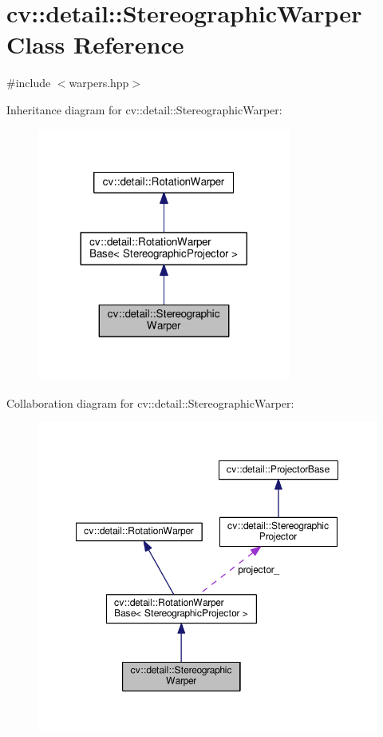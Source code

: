 \hypertarget{classcv_1_1detail_1_1StereographicWarper}{\section{cv\-:\-:detail\-:\-:Stereographic\-Warper Class Reference}
\label{classcv_1_1detail_1_1StereographicWarper}
}


{\ttfamily \#include $<$warpers.\-hpp$>$}



Inheritance diagram for cv\-:\-:detail\-:\-:Stereographic\-Warper\-:\nopagebreak
\begin{figure}[H]
\begin{center}
\leavevmode
\includegraphics[width=236pt]{classcv_1_1detail_1_1StereographicWarper__inherit__graph}
\end{center}
\end{figure}


Collaboration diagram for cv\-:\-:detail\-:\-:Stereographic\-Warper\-:\nopagebreak
\begin{figure}[H]
\begin{center}
\leavevmode
\includegraphics[width=350pt]{classcv_1_1detail_1_1StereographicWarper__coll__graph}
\end{center}
\end{figure}
